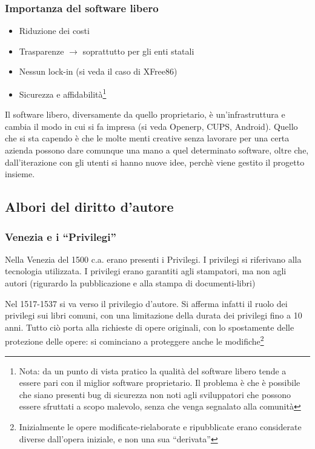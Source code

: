 \subsubsection{Importanza del software libero}

\begin{itemize}

\item Riduzione dei costi

\item Trasparenze $\to$ soprattutto per gli enti statali

\item Nessun lock-in (si veda il caso di XFree86)

\item Sicurezza e affidabilit\`a\footnote{Nota: da un punto di vista pratico la qualit\`a del software libero tende a essere pari con il miglior software proprietario. Il problema \`e che \`e possibile che siano presenti bug di sicurezza non noti agli sviluppatori che possono essere sfruttati a scopo malevolo, senza che venga segnalato alla comunit\`a}

\end{itemize}

Il software libero, diversamente da quello proprietario, \`e un'infrastruttura e cambia il modo in cui si fa impresa (si veda Openerp, CUPS, Android). Quello che si sta capendo \`e che le molte menti creative senza lavorare per una certa azienda possono dare comunque una mano a quel determinato software, oltre che, dall'iterazione con gli utenti si hanno nuove idee, perch\`e viene gestito il progetto insieme.

\subsection{Albori del diritto d'autore}

\subsubsection{Venezia e i ``Privilegi''}

Nella Venezia del 1500 c.a. erano presenti i Privilegi. I privilegi si riferivano alla tecnologia utilizzata. I privilegi erano garantiti agli stampatori, ma non agli autori (rigurardo la pubblicazione e alla stampa di documenti-libri)

Nel 1517-1537 si va verso il privilegio d'autore. Si afferma infatti il ruolo dei privilegi sui libri comuni, con una limitazione della durata dei privilegi fino a 10 anni. Tutto ci\`o porta alla richieste di opere originali, con lo spostamente delle protezione delle opere: si cominciano a proteggere anche le modifiche\footnote{Inizialmente le opere modificate-rielaborate e ripubblicate erano considerate diverse dall'opera iniziale, e non una sua ``derivata''}

